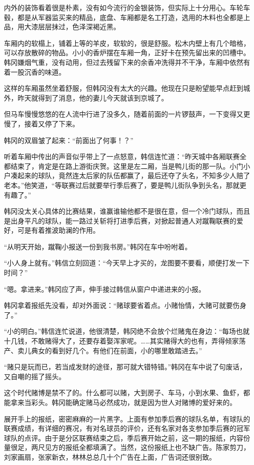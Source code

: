 内外的装饰看着很是朴素，没有如今流行的金银装饰，但实际上十分用心。车轮车毂，都是从军器监买来的精品，底盘、车厢都是名工打造，选用的木料也全都是上品，用大漆层层抹过，色泽深褐近黑。

车厢内的软榻上，铺着上等的羊皮，软软的，很是舒服。松木内壁上有几个暗格，可以存放散碎的物品。小小的香炉摆在车厢一角，正好卡在预先留出来的凹槽中。韩冈嫌烟气重，没有动用，但过去残留下来的余香冲洗得并不干净，车厢中依然有着一股沉香的味道。

这样的车厢虽然坐着舒服，但韩冈没有太大的兴趣。他现在只是盼望能早点赶到城外，昨天就得到了消息，他的妻儿今天就该到京城了。

但马车慢慢悠悠的在人流中行进了没多久，随着前面的一片锣鼓声，一下变得又更慢了，接着又停了下来。

韩冈的双眉皱了起来：“前面出了何事！？”

听着车厢中传出的声音似乎带上了一点怒意，韩信连忙道：“昨天城中各厢联赛全都结束了，肯定是在路上游街庆贺。这里是左二厢，当是鸭儿街的那一队。小门小户凑起来的球队，竟然连太后家的队伍都赢了，最后还夺了头名，不知多少人赔了老本。”他笑道，“等联赛过后就要举行季后赛了，要是鸭儿街队争到头名，那就更有趣了。”

韩冈没太关心具体的比赛结果，谁赢谁输他都不是很在意，但一个冷门球队，而且是出身平凡的球队，能一路过关斩将打进季后赛，对掀起普通人对蹴鞠联赛的爱好，可是有着推波助澜的作用。

“从明天开始，蹴鞠小报送一份到我书房。”韩冈在车中吩咐着。

“小人身上就有。”韩信立刻回道：“今天早上才买的，龙图要不要看，顺便打发一下时间？”

“嗯。拿进来。”韩冈应了声，伸手接过韩信从窗户中递进来的小报。

韩冈拿着报纸先没看，却对外面说：“赌球要省着点。小赌怡情，大赌可就要伤身了。”

“小的明白。”韩信连忙说道，他很清楚，韩冈绝不会放个烂赌鬼在身边：“每场也就十几钱，不敢赌得大了，还要存着娶浑家呢。……其实赌得大的也有，弄得倾家荡产、卖儿典女的看到好几个。有他们在前面，小的哪里敢踏进去。”

“赌只是玩而已，若当成发财的途径，那可就大错特错。”韩冈在车中说了句废话，又自嘲的摇了摇头。

这个时代赌博是禁不了的。什么都可以赌，大到房子、车马，小到水果、鱼虾，都能拿来当彩头。韩冈能确定赌马必然成功，就是因为世人对赌博的爱好来的。

展开手上的报纸，密密麻麻的一片黑字。上面有参加季后赛的球队名单，有球队的联赛成绩，有详细的赛况，有对名球员的评价，还有名家对各支参加季后赛的冠军球队的点评。由于是分区联赛结束之后，季后赛开始之前，这一期的报纸，内容份量很足，两尺见方的报纸全都填满了。当然，这份报纸上也不缺广告。陈家剪刀，刘家画扇，张家新衣，林林总总几十个广告在上面，广告词还很别致。

